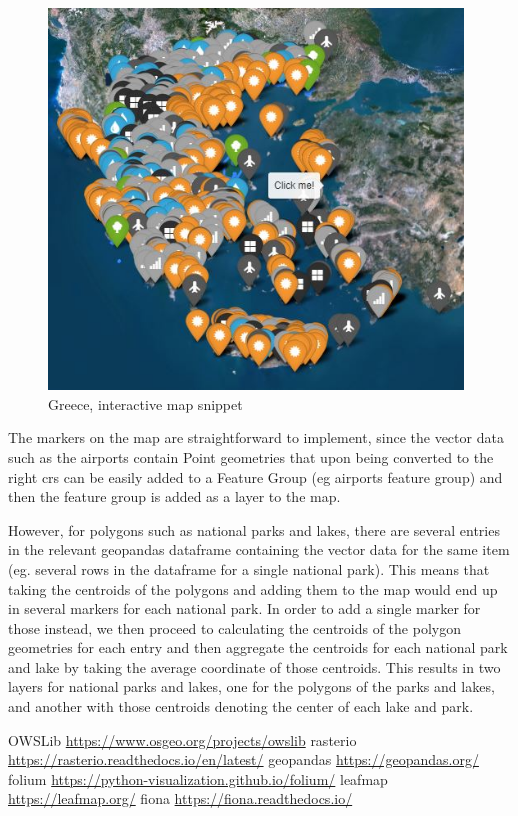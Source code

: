 \begin{figure}[h]
    \centering
    \includegraphics[width=11cm]{figures/q4_map_snippet.JPG}
    \caption{Greece, interactive map snippet}
    \label{fig:Greece, interactive map snippet}
\end{figure}
\FloatBarrier %

The markers on the map are straightforward to implement, since the vector data such as the airports contain Point geometries that upon being converted to the right crs can be easily added to a Feature Group (eg airports feature group) and then the feature group is added as a layer to the map. 

However, for polygons such as national parks and lakes, there are several entries in the relevant geopandas dataframe containing the vector data for the same item (eg. several rows in the dataframe for a single national park). This means that taking the centroids of the polygons and adding them to the map would end up in several markers for each national park. In order to add a single marker for those instead, we then proceed to calculating the centroids of the polygon geometries for each entry and then aggregate the centroids for each national park and lake by taking the average coordinate of those centroids. This results in two layers for national parks and lakes, one for the polygons of the parks and lakes, and another with those centroids denoting the center of each lake and park. 

\begin{thebibliography}{9}
OWSLib \url{https://www.osgeo.org/projects/owslib}
rasterio \url{https://rasterio.readthedocs.io/en/latest/}
geopandas \url{https://geopandas.org/}
folium \url{https://python-visualization.github.io/folium/}
leafmap \url{https://leafmap.org/}
fiona \url{https://fiona.readthedocs.io/}
\end{thebibliography}